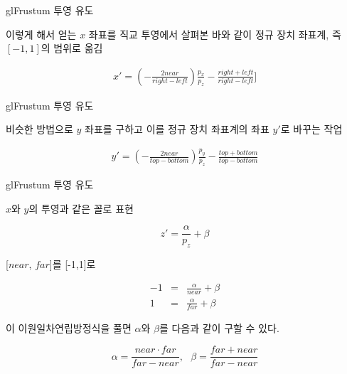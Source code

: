 \documentclass{beamer}
\begin{document}
\begin{frame}[fragile]{glFrustum 투영 유도}

이렇게 해서 얻는 $x$ 좌표를 직교 투영에서 살펴본 바와 같이
정규 장치 좌표계, 즉 $[-1,1]$의 범위로 옮김

\begin{eqnarray}
x' = \left ( - \frac{2 near}{right-left} \right ) \frac{p_x}{p_z} - \frac{right+left}{right-left} ] \nonumber
\end{eqnarray}


\end{frame}


\begin{frame}[fragile]{glFrustum 투영 유도}

비슷한 방법으로 $y$ 좌표를 구하고 이를 정규 장치 좌표계의 좌표 $y'$로 바꾸는 작업

\begin{eqnarray}
\label{eq:OGL_camera:frustumYProjection}
y' = \left ( - \frac{2 near}{top-bottom} \right ) \frac{p_y}{p_z} - \frac{top + bottom}{top - bottom}
\end{eqnarray}


\end{frame}

\begin{frame}[fragile]{glFrustum 투영 유도}

$x$와 $y$의 투영과 같은 꼴로 표현

$$z' = \frac{\alpha}{p_z} + \beta$$

[$near$, $far$]를 [-1,1]로

\begin{eqnarray}
-1 & = & \frac{\alpha}{near} + \beta \\ \nonumber
  1 & = & \frac{\alpha}{far} + \beta
\end{eqnarray}

이 이원일차연립방정식을 풀면 $\alpha$와 $\beta$를 다음과 같이 구할 수 있다.

$$\alpha = \frac{near \cdot far}{far - near}, ~~~ \beta = \frac{far+near}{far-near}$$


\end{frame}
\end{document}
